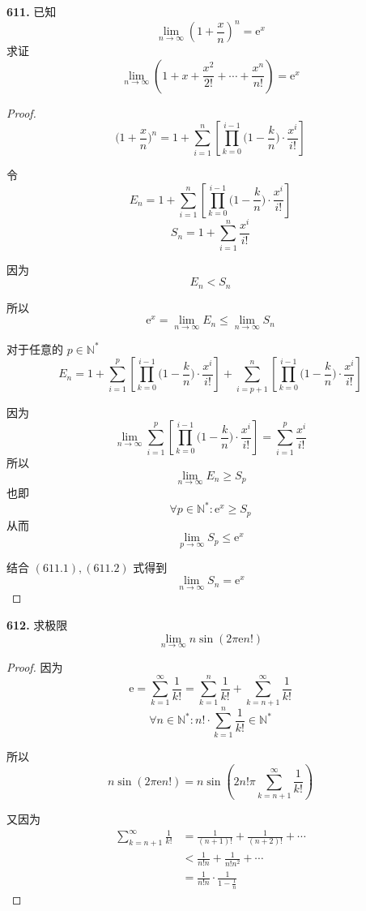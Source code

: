 \textbf{611.} 已知
\[\lim_{n \rightarrow \infty} \left(1 + \frac{x}{n}\right)^n = \mathrm{e}^x\]
求证
\[\lim_{n \rightarrow \infty} \left(1 + x + \frac{x^2}{2!} + \cdots + \frac{x^n}{n!}\right) = \mathrm{e}^x\]

\begin{proof}
    \[\biggl(1 + \frac{x}{n}\biggr)^n = 1 + \sum_{i=1}^{n} \left[\prod_{k=0}^{i-1}\biggl(1 - \frac{k}{n}\biggr) \cdot \frac{x^i}{i!}\right]\]

    令
    \[E_n = 1 + \sum_{i=1}^{n} \left[\prod_{k=0}^{i-1}\biggl(1 - \frac{k}{n}\biggr) \cdot \frac{x^i}{i!}\right]\]
    \[S_n = 1 + \sum_{i=1}^{n} \frac{x^i}{i!}\]

    因为
    \[E_n < S_n\]

    所以
    \[\mathrm{e}^x = \lim_{n \rightarrow \infty} E_n \leqslant \lim_{n \rightarrow \infty} S_n \tag{611.1}\]

    对于任意的 $p \in \mathbb{N}^*$
    \[E_n = 1 + \sum_{i=1}^{p} \left[\prod_{k=0}^{i-1} \biggl(1 - \frac{k}{n}\biggr) \cdot \frac{x^i}{i!}\right] + \sum_{i=p+1}^{n} \left[\prod_{k=0}^{i-1} \biggl(1 - \frac{k}{n}\biggr) \cdot \frac{x^i}{i!}\right]\]

    因为
    \[\lim_{n \rightarrow \infty} \sum_{i=1}^{p} \left[\prod_{k=0}^{i-1} \biggl(1 - \frac{k}{n}\biggr) \cdot \frac{x^i}{i!}\right] = \sum_{i=1}^{p} \frac{x^i}{i!}\]
    所以
    \[\lim_{n \rightarrow \infty} E_n \geqslant S_p\]
    也即
    \[\forall p \in \mathbb{N}^*: \mathrm{e}^x \geqslant S_p\]
    从而
    \[\lim_{p \rightarrow \infty} S_p \leqslant \mathrm{e}^x \tag{611.2}\]

    结合 $(611.1),(611.2)$ 式得到
    \[\lim_{n \rightarrow \infty} S_n = \mathrm{e}^x\]
\end{proof}\vspace{9pt}

\textbf{612.} 求极限
\[\lim_{n \rightarrow \infty} n \sin(2\pi\mathrm{e}n!)\]

\begin{proof}
    因为
    \[\mathrm{e} = \sum_{k=1}^{\infty} \frac{1}{k!} = \sum_{k=1}^{n} \frac{1}{k!} + \sum_{k=n+1}^{\infty} \frac{1}{k!}\]
    \[\forall n \in \mathbb{N}^*: n! \cdot \sum_{k=1}^{n} \frac{1}{k!} \in \mathbb{N}^*\]

    所以
    \[n \sin (2\pi \mathrm{e} n!) = n \sin \left(2n! \pi \sum_{k=n+1}^{\infty} \frac{1}{k!}\right)\]

    又因为
    \begin{align*}
        \sum_{k=n+1}^{\infty} \frac{1}{k!} &= \frac{1}{(n+1)!} + \frac{1}{(n+2)!} + \cdots\\
        &< \frac{1}{n!n} + \frac{1}{n!n^2} + \cdots\\
        &= \frac{1}{n!n} \cdot \frac{1}{1-\frac{1}{n}}
    \end{align*}
\end{proof}\vspace{9pt}

